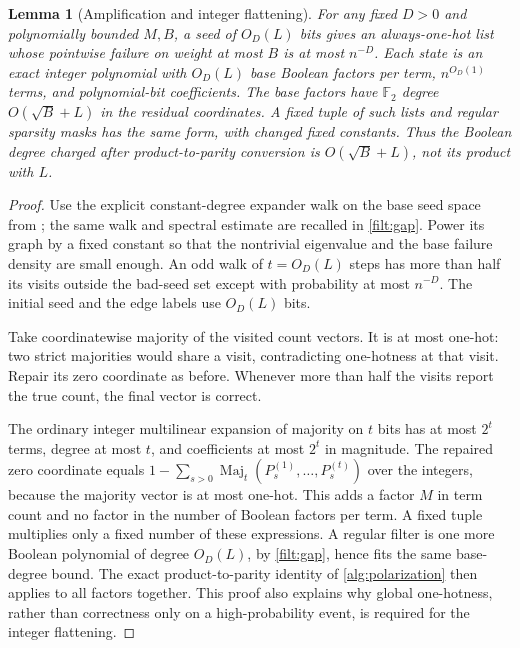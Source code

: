\documentclass[11pt,letterpaper]{article}
\newtheorem{lemma}[theorem]{Lemma}
\theoremstyle{definition}
\theoremstyle{remark}
\newcommand{\F}{\mathbb F}
\begin{document}
\begin{lemma}[Amplification and integer flattening]
\label{list:flatten}
For any fixed $D>0$ and polynomially bounded $M,B$, a seed of $O_D(L)$
bits gives an always-one-hot list whose pointwise failure on weight at
most $B$ is at most $n^{-D}$. Each state is an exact integer polynomial
with $O_D(L)$ base Boolean factors per term, $n^{O_D(1)}$ terms, and
polynomial-bit coefficients. The base factors have $\F_2$ degree
$O(\sqrt B+L)$ in the residual coordinates. A fixed tuple of such
lists and regular sparsity masks has the same form, with changed fixed
constants. Thus the Boolean degree charged after product-to-parity
conversion is $O(\sqrt B+L)$, not its product with $L$.
\end{lemma}
\begin{proof}
Use the explicit constant-degree expander walk on the base seed space
from \cite[Lemma A.3]{NagCubic}; the same walk and spectral estimate
are recalled in \cref{filt:gap}. Power its graph by a fixed constant so
that the nontrivial eigenvalue and the base failure density are small
enough. An odd walk of $t=O_D(L)$ steps has more than half its visits
outside the bad-seed set except with probability at most $n^{-D}$.
The initial seed and the edge labels use $O_D(L)$ bits.

Take coordinatewise majority of the visited count vectors. It is
at most one-hot: two strict majorities would share a visit, contradicting
one-hotness at that visit. Repair its zero coordinate as before. Whenever
more than half the visits report the true count, the final vector is
correct.

The ordinary integer multilinear expansion of majority on $t$ bits
has at most $2^t$ terms, degree at most $t$, and coefficients at most
$2^t$ in magnitude. The repaired zero coordinate equals
$1-\sum_{s>0}\operatorname{Maj}_t(P^{(1)}_s,\ldots,P^{(t)}_s)$
over the integers, because the majority vector is at most one-hot.
This adds a factor $M$ in term count and no factor in the number of
Boolean factors per term. A fixed tuple multiplies only a fixed number
of these expressions. A regular filter is one more Boolean polynomial
of degree $O_D(L)$, by \cref{filt:gap}, hence fits the same base-degree
bound. The exact product-to-parity identity of \cref{alg:polarization}
then applies to all factors together. This proof also explains why
global one-hotness, rather than correctness only on a high-probability
event, is required for the integer flattening.
\end{proof}
\end{document}
